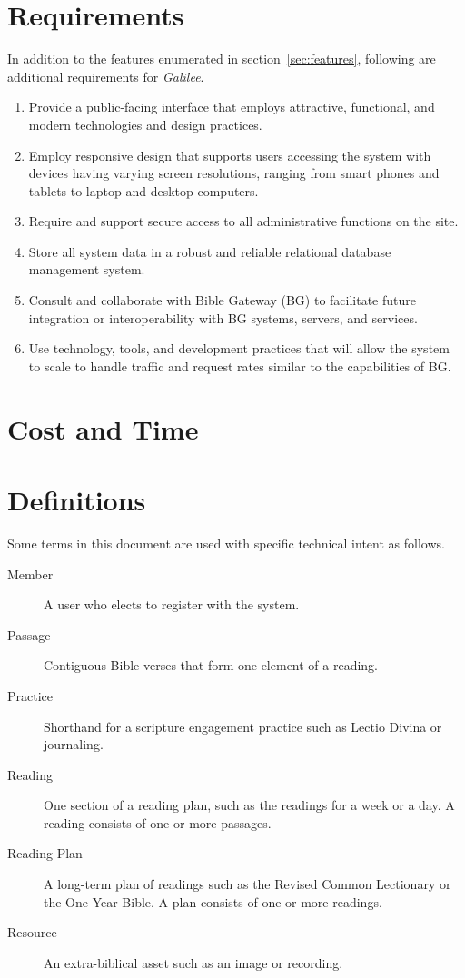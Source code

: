 \documentclass{article}
\newcommand{\gal}{\emph{Galilee}}
\begin{document}
\section{Requirements}
\label{sec:requirements}

In addition to the features enumerated in section~\ref{sec:features},
following are additional requirements for \gal.
\begin{enumerate}
\item Provide a public-facing interface
  that employs attractive, functional, and modern
  technologies and design practices.
\item Employ responsive design that supports users accessing the system
  with devices having varying screen resolutions,
  ranging from smart phones and tablets to laptop and desktop computers.
\item Require and support secure access to all administrative functions
  on the site.
\item Store all system data in a robust and reliable
  relational database management system.
\item Consult and collaborate with Bible Gateway (BG)
  to facilitate future integration or interoperability
  with BG systems, servers, and services.
\item Use technology, tools, and development practices
  that will allow the system to scale
  to handle traffic and request rates
  similar to the capabilities of BG.
\end{enumerate}

\section{Cost and Time}
\label{sec:cost-time}



\appendix

\section{Definitions}
\label{sec:defs}

Some terms in this document are used with specific technical intent
as follows.

\begin{description}
\item[Member] A user who elects to register with the system.
\item[Passage] Contiguous Bible verses
 that form one element of a reading.
\item[Practice] Shorthand for a scripture engagement practice
  such as Lectio Divina or journaling.
\item[Reading] One section of a reading plan,
  such as the readings for a week or a day.
  A reading consists of one or more passages.
\item[Reading Plan] A long-term plan of readings
  such as the Revised Common Lectionary or the One Year Bible.
  A plan consists of one or more readings.
\item[Resource] An extra-biblical asset such as an image or recording.
\end{description}
\end{document}
